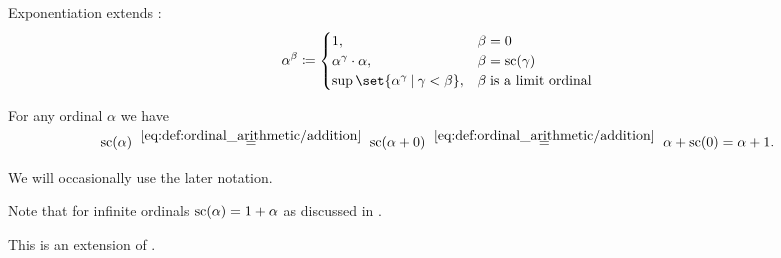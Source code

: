 \begin{definition}
\begin{thmenum}
     Exponentiation extends :
    \begin{equation}\label{eq:def:ordinal_arithmetic/exponentiation}
      \alpha^\beta \coloneqq \begin{cases}
        1,                                               &\beta = 0 \\
        \alpha^\gamma \cdot \alpha,                      &\beta = \op{sc}(\gamma) \\
        \sup\set{ \alpha^\gamma \given \gamma < \beta }, &\beta \T{is a limit ordinal} \\
      \end{cases}
    \end{equation}
  \end{thmenum}
\end{definition}

\begin{remark}\label{rem:ordinal_successor_via_addition}
  For any ordinal \( \alpha \) we have
  \begin{equation*}
    \op{sc}(\alpha)
    \reloset {\ref{eq:def:ordinal_arithmetic/addition}} =
    \op{sc}(\alpha + 0)
    \reloset {\ref{eq:def:ordinal_arithmetic/addition}} =
    \alpha + \op{sc}(0)
    =
    \alpha + 1.
  \end{equation*}

  We will occasionally use the later notation.

  Note that for infinite ordinals \( \op{sc}(\alpha) = 1 + \alpha \) as discussed in .

  This is an extension of .
\end{remark}

